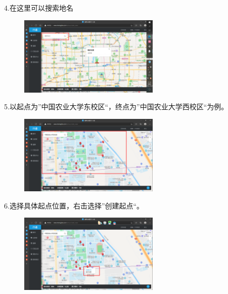 \documentclass{ctexbook}
\begin{document}
4.在这里可以搜索地名
       \begin{figure}[H]
            \begin{center}
            \includegraphics[width=0.6\textwidth]{fig/行者4}
            \end{center}
        \end{figure}

5.以起点为''中国农业大学东校区``，终点为''中国农业大学西校区``为例。
       \begin{figure}[H]
            \begin{center}
            \includegraphics[width=0.6\textwidth]{fig/行者5}
            \end{center}
        \end{figure}

6.选择具体起点位置，右击选择''创建起点``。
       \begin{figure}[H]
            \begin{center}
            \includegraphics[width=0.6\textwidth]{fig/行者6}
            \end{center}
        \end{figure}
\end{document}
